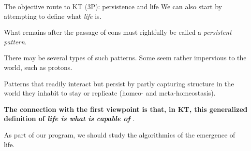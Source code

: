 \begin{frame}[label=intro4]{The objective route to KT (3P): persistence and life}
We can also start by attempting to define what {\em life} is.\vfill

What remains after the passage of eons must rightfully be called a {\em persistent pattern}.\vfill

There may be several types of such patterns. Some seem rather  impervious to the world, such as protons.  \vfill

\begin{definition}[Life]
Patterns that readily interact but persist by partly capturing  structure in the world they inhabit  to stay or replicate (homeo- and meta-homeostasis).  \end{definition}\vfill

 {\bf The connection with the first viewpoint is that, in KT, this {generalized definition of \em life is what is capable of \SEP}}. \vfill 
 
 As part of our program, we should study the algorithmics of the emergence of life. 
\end{frame}







